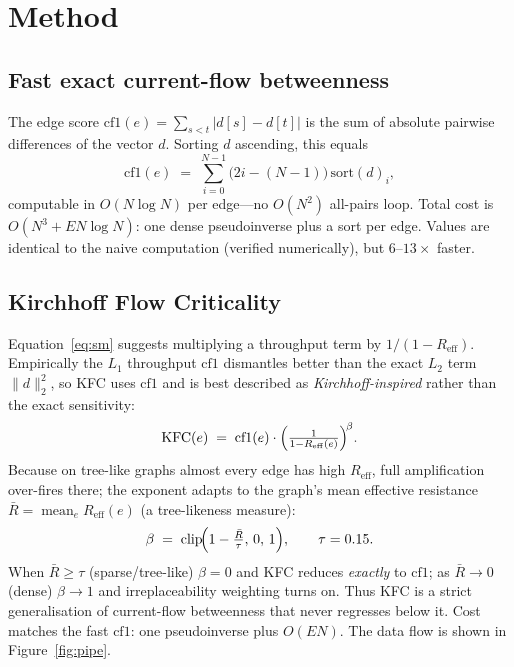 \documentclass[11pt]{article}
\begin{document}
\section{Method}
\subsection{Fast exact current-flow betweenness}\label{sec:cf1}
The edge score $\mathrm{cf1}(e)=\sum_{s<t}|d[s]-d[t]|$ is the sum of absolute pairwise
differences of the vector $d$. Sorting $d$ ascending, this equals
\begin{equation}\label{eq:sorted}
\mathrm{cf1}(e) \;=\; \sum_{i=0}^{N-1}\bigl(2i-(N-1)\bigr)\,\mathrm{sort}(d)_i ,
\end{equation}
computable in $O(N\log N)$ per edge---no $O(N^2)$ all-pairs loop. Total cost is
$O(N^3 + E N \log N)$: one dense pseudoinverse plus a sort per edge. Values are identical
to the naive computation (verified numerically), but $6\text{--}13\times$ faster.

\subsection{Kirchhoff Flow Criticality}\label{sec:kfc}
Equation~\eqref{eq:sm} suggests multiplying a throughput term by
$1/(1-R_{\mathrm{eff}})$. Empirically the $L_1$ throughput $\mathrm{cf1}$ dismantles
better than the exact $L_2$ term $\lVert d\rVert_2^2$, so KFC uses $\mathrm{cf1}$ and is
best described as \emph{Kirchhoff-inspired} rather than the exact sensitivity:
\begin{equation}\label{eq:kfc}
\mathrm{KFC}(e) \;=\; \mathrm{cf1}(e)\cdot\Bigl(\tfrac{1}{1-R_{\mathrm{eff}}(e)}\Bigr)^{\!\beta}.
\end{equation}
Because on tree-like graphs almost every edge has high $R_{\mathrm{eff}}$, full
amplification over-fires there; the exponent adapts to the graph's mean effective
resistance $\bar{R}=\operatorname{mean}_e R_{\mathrm{eff}}(e)$ (a tree-likeness measure):
\begin{equation}\label{eq:beta}
\beta \;=\; \operatorname{clip}\!\Bigl(1-\tfrac{\bar{R}}{\tau},\,0,\,1\Bigr),\qquad \tau=0.15 .
\end{equation}
When $\bar{R}\ge\tau$ (sparse/tree-like) $\beta=0$ and KFC reduces \emph{exactly} to
$\mathrm{cf1}$; as $\bar{R}\to 0$ (dense) $\beta\to 1$ and irreplaceability weighting
turns on. Thus KFC is a strict generalisation of current-flow betweenness that never
regresses below it. Cost matches the fast $\mathrm{cf1}$: one pseudoinverse plus $O(EN)$.
The data flow is shown in Figure~\ref{fig:pipe}.
\end{document}
